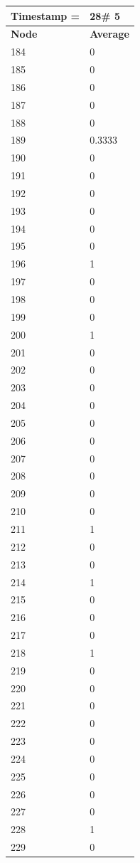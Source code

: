 \begin{tabular}{|l||l|}
\hline
\textbf{Timestamp =} & \textbf{28}\# 5\\\hline
	\textbf{Node} & \textbf{Average} \\ \hline
\hline
	184 & 0 \\ \hline
	185 & 0 \\ \hline
	186 & 0 \\ \hline
	187 & 0 \\ \hline
	188 & 0 \\ \hline
	189 & 0.3333 \\ \hline
	190 & 0 \\ \hline
	191 & 0 \\ \hline
	192 & 0 \\ \hline
	193 & 0 \\ \hline
	194 & 0 \\ \hline
	195 & 0 \\ \hline
	196 & 1 \\ \hline
	197 & 0 \\ \hline
	198 & 0 \\ \hline
	199 & 0 \\ \hline
	200 & 1 \\ \hline
	201 & 0 \\ \hline
	202 & 0 \\ \hline
	203 & 0 \\ \hline
	204 & 0 \\ \hline
	205 & 0 \\ \hline
	206 & 0 \\ \hline
	207 & 0 \\ \hline
	208 & 0 \\ \hline
	209 & 0 \\ \hline
	210 & 0 \\ \hline
	211 & 1 \\ \hline
	212 & 0 \\ \hline
	213 & 0 \\ \hline
	214 & 1 \\ \hline
	215 & 0 \\ \hline
	216 & 0 \\ \hline
	217 & 0 \\ \hline
	218 & 1 \\ \hline
	219 & 0 \\ \hline
	220 & 0 \\ \hline
	221 & 0 \\ \hline
	222 & 0 \\ \hline
	223 & 0 \\ \hline
	224 & 0 \\ \hline
	225 & 0 \\ \hline
	226 & 0 \\ \hline
	227 & 0 \\ \hline
	228 & 1 \\ \hline
	229 & 0 \\ \hline
\end{tabular}
